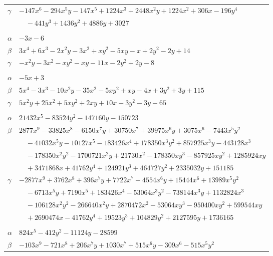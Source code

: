\documentclass[11pt]{article}
\begin{document}
\begin{longtable}{@{}ll@{}}
$\gamma$ & $-147x^{6}-294x^{5}y-147x^{5}+1224x^{3}+2448x^{2}y+1224x^{2}+306x-196y^{4}$\\
 & $\quad -441y^{3}+1436y^{2}+4886y+3027$\\
\addlinespace[3pt]
\multicolumn{2}{@{}l}{$\{i,j\}=\{32,41\}$, $k_{ij}=2\cdot 3\cdot 5$}\\
$\alpha$ & $-3x-6$\\
$\beta$ & $3x^{4}+6x^{3}-2x^{2}y-3x^{2}+xy^{2}-5xy-x+2y^{2}-2y+14$\\
$\gamma$ & $-x^{2}y-3x^{2}-xy^{2}-xy-11x-2y^{2}+2y-8$\\
\addlinespace[3pt]
\multicolumn{2}{@{}l}{$\{i,j\}=\{32,42\}$, $k_{ij}=2^{3}\cdot 3\cdot 7$}\\
$\alpha$ & $-5x+3$\\
$\beta$ & $5x^{4}-3x^{3}-10x^{2}y-35x^{2}-5xy^{2}+xy-4x+3y^{2}+3y+115$\\
$\gamma$ & $5x^{2}y+25x^{2}+5xy^{2}+2xy+10x-3y^{2}-3y-65$\\
\addlinespace[3pt]
\multicolumn{2}{@{}l}{$\{i,j\}=\{33,34\}$, $k_{ij}=2\cdot 3\cdot 7\cdot 11$}\\
$\alpha$ & $21432x^{5}-83524y^{2}-147160y-150723$\\
$\beta$ & $2877x^{9}-33825x^{8}-6150x^{7}y+30750x^{7}+39975x^{6}y+3075x^{6}-7443x^{5}y^{2}$\\
 & $\quad -41032x^{5}y-10127x^{5}-183426x^{4}+178350x^{3}y^{2}+857925x^{3}y-443128x^{3}$\\
 & $\quad -178350x^{2}y^{2}-1700721x^{2}y+21730x^{2}-178350xy^{3}-857925xy^{2}+1285924xy$\\
 & $\quad +3471868x+41762y^{4}+124921y^{3}+464727y^{2}+2335032y+151185$\\
$\gamma$ & $-2877x^{9}+3762x^{8}+396x^{7}y+7722x^{7}+4554x^{6}y+15444x^{6}+13989x^{5}y^{2}$\\
 & $\quad -6713x^{5}y+7190x^{5}+183426x^{4}-53064x^{3}y^{2}-738144x^{3}y+1132824x^{3}$\\
 & $\quad -106128x^{2}y^{2}-266640x^{2}y+2870472x^{2}-53064xy^{3}-950400xy^{2}+599544xy$\\
 & $\quad +2690474x-41762y^{4}+19523y^{3}+104829y^{2}+2127595y+1736165$\\
\addlinespace[3pt]
\multicolumn{2}{@{}l}{$\{i,j\}=\{33,37\}$, $k_{ij}=2\cdot 3^{6}\cdot 7\cdot 11$}\\
$\alpha$ & $824x^{5}-412y^{2}-11124y-28599$\\
$\beta$ & $-103x^{9}-721x^{8}+206x^{7}y+1030x^{7}+515x^{6}y-309x^{6}-515x^{5}y^{2}$\\

\end{longtable}
\end{document}
